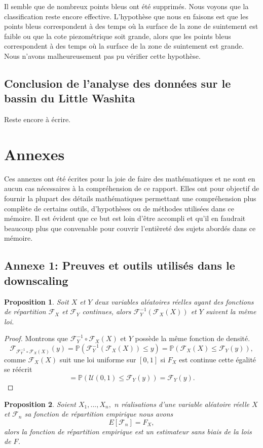 \documentclass[a4paper,11pt]{article}
\numberwithin{equation}{section}
\newtheorem{proposition}{Proposition}
\begin{document}
Il semble que de nombreux points bleus ont été supprimés. Nous voyons que la classification reste encore effective. L'hypothèse que nous en faisons est que les points bleus correspondent à des temps où la surface de la zone de suintement est faible ou que la cote piezométrique soit grande, alors que les points bleus correspondent à des temps où la surface de la zone de suintement est grande. Nous n'avons malheureusement pas pu vérifier cette hypothèse.

\subsection{Conclusion de l'analyse des données sur le bassin du Little Washita} 

Reste encore à écrire.

\newpage
\section{Annexes}

Ces annexes ont été écrites pour la joie de faire des mathématiques et ne sont en aucun cas nécessaires à la compréhension de ce rapport. Elles ont pour objectif de fournir la plupart des détails mathématiques permettant une compréhension plus complète de certains outils, d'hypothèses ou de méthodes utilisées dans ce mémoire. Il est évident que ce but est loin d'être accompli et qu'il en faudrait beaucoup plus que convenable pour couvrir l'entièreté des sujets abordés dans ce mémoire.
 
\subsection{Annexe 1: Preuves et outils utilisés dans le downscaling}
\label{ch:outils-mathematiques}

\begin{proposition}
	Soit $X$ et $Y$ deux variables aléatoires réelles ayant des fonctions de répartition $\mathcal{F}_{X}$ et $\mathcal{F}_{Y}$ continues, alors 
	$\mathcal{F}^{-1}_Y (\mathcal{F}_X(X))$ et $Y$ suivent la même loi. 
\end{proposition}
\begin{proof}
	Montrons que $\mathcal{F}^{-1}_Y \circ \mathcal{F}_X(X)$ et $Y$ possède la même fonction de densité. 
	\[\mathcal{F}_{\mathcal{F}^{-1}_Y \circ \mathcal{F}_X(X)}(y)
	= \mathbb{P}(\mathcal{F}^{-1}_Y (\mathcal{F}_X(X))\leq y )
	= \mathbb{P}(\mathcal{F}_{X}(X) \leq \mathcal{F}_Y(y)),\]
	comme $\mathcal{F}_{X}(X)$ suit une loi uniforme sur $[0,1]$ si $F_X$ est continue cette égalité se réécrit
	\[= \mathbb{P}(\mathcal{U}(0,1) \leq \mathcal{F}_Y(y))=\mathcal{F}_Y(y).\]
\end{proof}
\begin{proposition}
	\label{mean-rep-emp}
	Soient $X_1,...,X_n,$ $n$ réalisations d'une variable aléatoire réelle $X$ et $\mathcal{F}_{n}$ sa fonction de répartition empirique nous avons
	\[E[\mathcal{F}_n]=F_{X},\]
	alors la fonction de répartition empirique est un estimateur sans biais de la lois de $F$. 
\end{proposition}
\end{document}

